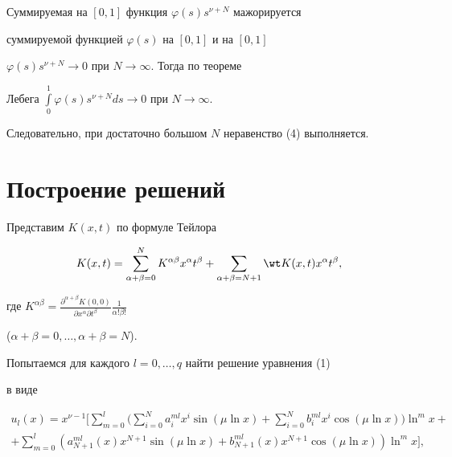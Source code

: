  


Суммируемая на $[0,1]$ функция $\varphi(s)s^{\nu+N}$ мажорируется 


суммируемой функцией $\varphi(s)$ на $[0,1]$ и на $[0,1]$ \ 


$\varphi(s)s^{\nu+N}\to0$ при $N\to\infty$. Тогда по теореме 


Лебега $\int\limits^1_0\varphi(s)s^{\nu+N}ds\to0$ при $N\to\infty$. 


 


Следовательно, при достаточно большом $N$ неравенство (4) выполняется. 


 


\section{Построение решений} 


 


Представим $K(x,t)$ по формуле Тейлора 


\begin{equation} 


K(x,t)=\sum^N_{\alpha+\beta=0}K^{\alpha\beta} 


x^\alpha t^\beta+\sum_{\alpha+\beta=N+1}\wt K(x,t) 


x^\alpha t^\beta, 


\end{equation} 


где $K^{\alpha\beta}=\frac{\partial^{\alpha+\beta}K(0,0)} 


{\partial x^\alpha\partial t^\beta}\frac{1}{\alpha!\beta!}$ 


($\alpha+\beta=0,\dotsc,\alpha+\beta=N$). 


 


Попытаемся для каждого $l=0,\dotsc,q$ найти решение уравнения (1) 


в виде 


\begin{multline} 


u_l(x)=x^{\nu-1}\bigg[\sum^l_{m=0}\bigg(\sum^N_{i=0} 


a^{ml}_i x^i\sin(\mu\ln x)+\sum^N_{i=0}b^{ml}_i x^i 


\cos(\mu\ln x)\bigg)\ln^m x+ \\ 


% 


+\sum^l_{m=0}(a^{ml}_{N+1}(x)x^{N+1}\sin(\mu\ln x)+ 


b^{ml}_{N+1}(x)x^{N+1}\cos(\mu\ln x))\ln^m x\bigg], 


\end{multline} 


